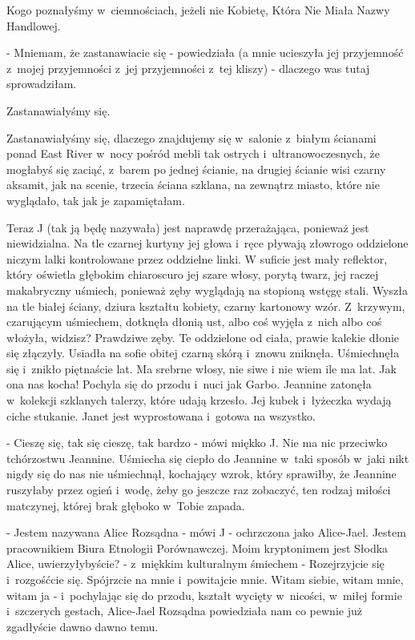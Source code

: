 \documentclass[oneside,polish,12pt,sfheadings]{mwbk}
\begin{document}
Kogo poznałyśmy w~ciemnościach, jeżeli nie Kobietę, Która Nie Miała
Nazwy Handlowej.

- Mniemam, że zastanawiacie się - powiedziała (a mnie ucieszyła jej
przyjemność z~mojej przyjemności z~jej przyjemności z~tej kliszy)
- dlaczego was tutaj sprowadziłam.

Zastanawiałyśmy się.

Zastanawiałyśmy się, dlaczego znajdujemy się w~salonie z~białym ścianami
ponad East River w~nocy pośród mebli tak ostrych i~ultranowoczesnych,
że mogłabyś się zaciąć, z~barem po jednej ścianie, na drugiej ścianie
wisi czarny aksamit, jak na scenie, trzecia ściana szklana, na zewnątrz
miasto, które nie wyglądało, tak jak je zapamiętałam.

Teraz J (tak ją będę nazywała) jest naprawdę przerażająca, ponieważ
jest niewidzialna. Na tle czarnej kurtyny jej głowa i~ręce pływają
złowrogo oddzielone niczym lalki kontrolowane przez oddzielne linki.
W suficie jest mały reflektor, który oświetla głębokim chiaroscuro
jej szare włosy, porytą twarz, jej raczej makabryczny uśmiech, ponieważ
zęby wyglądają na stopioną wstęgę stali. Wyszła na tle białej ściany,
dziura kształtu kobiety, czarny kartonowy wzór. Z~krzywym, czarującym
uśmiechem, dotknęła dłonią ust, albo coś wyjęła z~nich albo coś włożyła,
widzisz? Prawdziwe zęby. Te oddzielone od ciała, prawie kalekie dłonie
się złączyły. Usiadła na sofie obitej czarną skórą i~znowu zniknęła.
Uśmiechnęła się i~znikło piętnaście lat. Ma srebrne włosy, nie siwe
i nie wiem ile ma lat. Jak ona nas kocha! Pochyla się do przodu i~nuci jak Garbo. Jeannine zatonęła w~kolekcji szklanych talerzy, które
udają krzesło. Jej kubek i~łyżeczka wydają ciche stukanie. Janet jest
wyprostowana i~gotowa na wszystko.

- Cieszę się, tak się cieszę, tak bardzo - mówi miękko J. Nie ma nic
przeciwko tchórzostwu Jeannine. Uśmiecha się ciepło do Jeannine w~taki sposób w~jaki nikt nigdy się do nas nie uśmiechnął, kochający
wzrok, który sprawiłby, że Jeannine ruszyłaby przez ogień i~wodę,
żeby go jeszcze raz zobaczyć, ten rodzaj miłości matczynej, której
brak głęboko w~Tobie zapada.

- Jestem nazywana Alice Rozsądna - mówi J - ochrzczona jako Alice-Jael.
Jestem pracownikiem Biura Etnologii Porównawczej. Moim kryptonimem
jest Słodka Alice, uwierzyłybyście? - z~miękkim kulturalnym śmiechem
- Rozejrzyjcie się i~rozgośćcie się. Spójrzcie na mnie i~powitajcie
mnie. Witam siebie, witam mnie, witam ja - i~pochylając się do przodu,
kształt wycięty w~nicości, w~miłej formie i~szczerych gestach, Alice-Jael
Rozsądna powiedziała nam co pewnie już zgadłyście dawno dawno temu.
\end{document}
